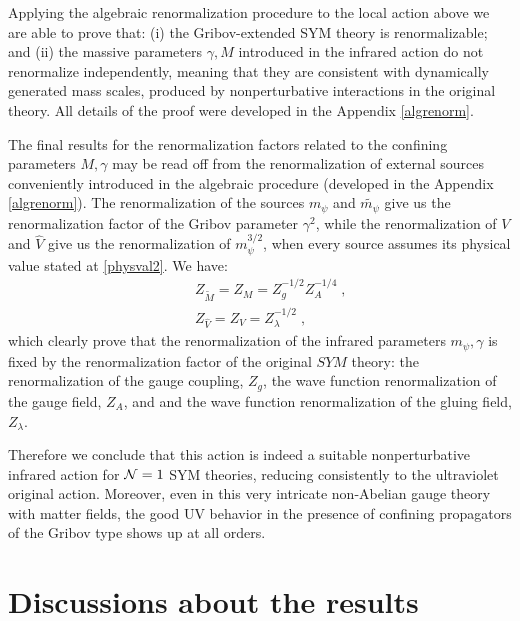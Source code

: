 Applying the algebraic renormalization procedure to the local action above we are able to prove that:
(i) the Gribov-extended SYM theory is renormalizable; and (ii) the massive parameters $\gamma,
M$ introduced in the infrared action do not renormalize independently, meaning that they are
consistent with dynamically generated mass scales, produced by nonperturbative interactions in
the original theory. All details of the proof were developed in the Appendix \eqref{algrenorm}.

The final results for the renormalization factors related to the confining parameters
$M,\gamma$ may be read off from the renormalization of external sources conveniently introduced
in the algebraic procedure (developed in the Appendix \eqref{algrenorm}). The renormalization of
the sources $m_{\psi}$ and $\tilde{m_{\psi}}$ give us the renormalization factor of the Gribov
parameter $\gamma^{2}$, while the renormalization of $V$ and $\hat{V}$ give us the
renormalization of $m_{\psi}^{3/2}$, when every source assumes its physical value stated at
\eqref{physval2}. We have:
\begin{eqnarray}
&&
Z_{\tilde{M}} =Z_{M} = Z^{-1/2}_{g}Z^{-1/4}_{A}\;, \nonumber \\
&&
Z_{\hat{V}} =Z_{V} = Z^{-1/2}_{\lambda}\;,
\end{eqnarray}
which clearly prove that the renormalization of the infrared parameters $m_{\psi},\gamma$ is
fixed by the renormalization factor of the original $SYM$ theory: the renormalization of the
gauge coupling, $Z_g$, the wave function renormalization of the gauge field, $Z_A$, and and the
wave function renormalization of the gluing field, $Z_{\lambda}$.

Therefore we conclude that this action is indeed a suitable nonperturbative infrared action for
${\cal N}=1$ SYM theories, reducing consistently to the ultraviolet original action. Moreover,
even in this very intricate non-Abelian gauge theory with matter fields, the good UV behavior
in the presence of confining propagators of the Gribov type shows up at all orders.











\section{Discussions about the results\label{conc5}}



